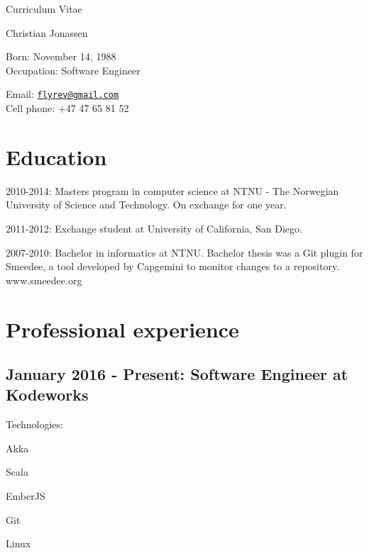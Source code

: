 \documentclass[letterpaper]{article}
\def\name{Christian Jonassen}
\renewenvironment{itemize}{
  \begin{list}{}{
    \setlength{\leftmargin}{1.5em}
  }
}{
  \end{list}
}
\begin{document}

\centerline{\LARGE Curriculum Vitae}

\centerline{}

\centerline{\huge \name}

\vspace{0.25in}

\begin{minipage}[t]{0.5\textwidth}
  Born: November 14, 1988 \\
  Occupation: Software Engineer
\end{minipage}
\begin{minipage}[t]{0.5\textwidth}
  Email: \href{mailto:flyrev@gmail.com}{\tt flyrev@gmail.com} \\
  Cell phone: +47 47 65 81 52
\end{minipage}

\section*{Education}

\begin{itemize}
  \item 2010-2014: Masters program in computer science at NTNU - The Norwegian University of Science and Technology. On exchange for one year.
    \item 2011-2012: Exchange student at University of California, San Diego.


  \item 2007-2010: Bachelor in informatics at NTNU. Bachelor thesis
    was a Git plugin for Smeedee, a tool developed by Capgemini to
    monitor changes to a repository. www.smeedee.org
\end{itemize}

\section*{Professional experience}
\subsection*{January 2016 - Present: Software Engineer at Kodeworks}
Technologies:
\begin{itemize}
\item Akka
\item Scala
\item EmberJS
\item Git
\item Linux
\end{itemize}
\end{document}

